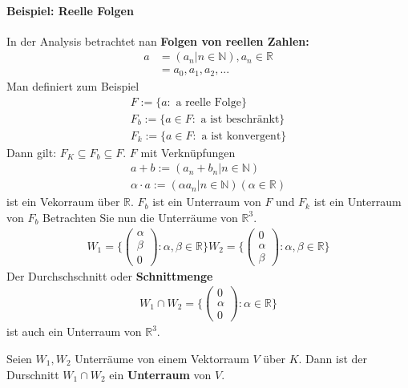 \documentclass[11pt]{report}
\newcommand*\Zb[1] {\mathbb{#1}}
\newcommand*\f[1] {\textbf{#1}}
\begin{document}
\paragraph{Beispiel: Reelle Folgen}
In der Analysis betrachtet nan \f{Folgen von reellen Zahlen:}
\begin{align}
 a &= (a_n|n \in \Zb{N}), a_n \in \Zb{R} \\
   &= a_0, a_1, a_2, ...
\end{align}
Man definiert zum Beispiel
\begin{align}
 F := \{a: \textrm{ a reelle Folge}\} \\
 F_b := \{a \in F: \textrm{ a ist beschränkt}\} \\
 F_k := \{a \in F: \textrm{ a ist konvergent}\} 
\end{align}
Dann gilt: $F_K \subseteq F_b \subseteq F$. $F$ mit Verknüpfungen
\begin{align}
 a + b := (a_n + b_n | n \in \Zb{N}) \\
 \alpha \cdot a := (\alpha a_n | n \in \Zb{N}) (\alpha \in \Zb{R})
\end{align}
ist ein Vekorraum über $\Zb{R}$. $F_b$ ist ein Unterraum von $F$ und $F_k$ ist ein Unterraum von $F_b$
Betrachten Sie nun die Unterräume von $\Zb{R}^3$.
\begin{align}
 W_1 = \{\begin{pmatrix}
       \alpha \\ \beta \\ 0 
       \end{pmatrix}: \alpha, \beta \in \Zb{R}\}
W_2 = \{\begin{pmatrix}
       0 \\ \alpha \\ \beta
       \end{pmatrix}: \alpha, \beta \in \Zb{R}\}
\end{align}
Der Durchschschnitt oder \f{Schnittmenge}
\begin{align}
W_1 \cap W_2 = \{\begin{pmatrix}
       0 \\ \alpha \\ 0
       \end{pmatrix}: \alpha \in \Zb{R}
\} 
\end{align}
ist auch ein Unterraum von $\Zb{R}^3$.
\begin{lemma}
 \label{lemma321}
Seien $W_1, W_2$ Unterräume von einem Vektorraum $V$ über $K$. Dann ist der Durschnitt $W_1 \cap W_2$ ein \f{Unterraum} von $V$.
\end{lemma}
\end{document}
